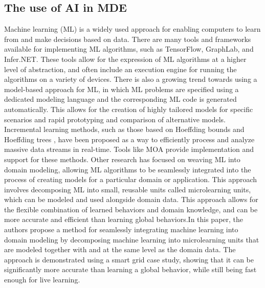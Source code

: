 \subsection{The use of AI in MDE}
Machine learning (ML) is a widely used approach for enabling computers to learn from and make decisions based on data. There are many tools and frameworks available for implementing ML algorithms, such as TensorFlow, GraphLab, and Infer.NET. These tools allow for the expression of ML algorithms at a higher level of abstraction, and often include an execution engine for running the algorithms on a variety of devices.
There is also a growing trend towards using a model-based approach for ML, in which ML problems are specified using a dedicated modeling language and the corresponding ML code is generated automatically. This allows for the creation of highly tailored models for specific scenarios and rapid prototyping and comparison of alternative models.
Incremental learning methods, such as those based on Hoeffding bounds and Hoeffding trees \cite{evolutionMDE}, have been proposed as a way to efficiently process and analyze massive data streams in real-time. Tools like MOA provide implementation and support for these methods.
Other research has focused on weaving ML into domain modeling, allowing ML algorithms to be seamlessly integrated into the process of creating models for a particular domain or application. This approach involves decomposing ML into small, reusable units called microlearning units, which can be modeled and used alongside domain data. This approach allows for the flexible combination of learned behaviors and domain knowledge, and can be more accurate and efficient than learning global behaviors.In this paper, the authors propose a method for seamlessly integrating machine learning into domain modeling by decomposing machine learning into microlearning units that are modeled together with and at the same level as the domain data. The approach is demonstrated using a smart grid case study, showing that it can be significantly more accurate than learning a global behavior, while still being fast enough for live learning.


